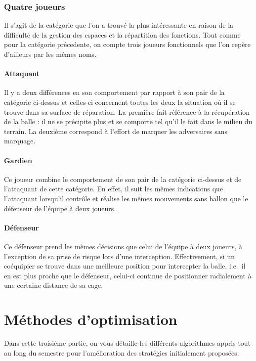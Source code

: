 \documentclass[12pt,a4paper]{article}
\begin{document}
\section{Quatre joueurs}
Il s'agit de la cat\'egorie que l'on a trouv\'e la plus int\'eressante en 
raison de la difficult\'e de la gestion des espaces et la r\'epartition des 
fonctions. Tout comme pour la cat\'egorie pr\'ecedente, on compte trois 
joueurs fonctionnels que l'on rep\`ere d'ailleurs par les m\^emes noms. 

\subsection*{Attaquant}
Il y a deux diff\'erences en son comportement par rapport \`a son pair 
de la cat\'egorie ci-dessus et celles-ci concernent toutes les deux la 
situation o\`u il se trouve dans sa surface de r\'eparation. La premi\`ere fait 
r\'ef\'erence \`a la r\'ecup\'eration de la balle : il ne se 
pr\'ecipite plus et se comporte tel qu'il le fait dans le milieu du terrain. La 
deuxi\`eme correspond \`a l'effort de marquer les adversaires sans 
marquage.

\subsection*{Gardien}
Ce joueur combine le comportement de son pair de la cat\'egorie ci-dessus et de 
l'attaquant de cette cat\'egorie. En effet, il suit les m\^emes indications que 
l'attaquant lorsqu'il contr\^ole et r\'ealise les m\^emes mouvements sans ballon 
que le d\'efenseur de l'\'equipe \`a deux joueurs.

\subsection*{D\'efenseur}
Ce d\'efenseur prend les m\^emes d\'ecisions que celui de l'\'equipe \`a 
deux joueurs, \`a l'exception de sa prise de risque lors d'une interception. 
Effectivement, si un co\'equipier se trouve dans une meilleure position pour 
intercepter la balle, i.e.\ il en est plus proche que le d\'efenseur, celui-ci 
continue de positionner radialement \`a une certaine distance de sa cage.

\newpage

\part{M\'ethodes d'optimisation}
Dans cette troisi\`eme partie, on vous d\'etaille les diff\'erents algorithmes 
appris tout au long du semestre pour l'am\'elioration des strat\'egies 
initialement propos\'ees.
\end{document}
